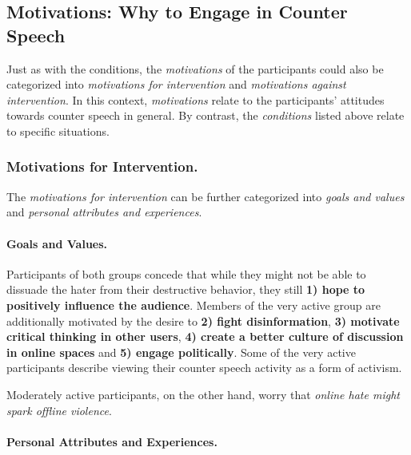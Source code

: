 \documentclass[runningheads]{llncs}
\begin{document}
\hypertarget{motivations-why-to-engage-in-counter-speech}{%
\subsection{Motivations: Why to Engage in Counter Speech}\label{motivations-why-to-engage-in-counter-speech}}

Just as with the conditions, the \emph{motivations} of the participants could also be categorized into \emph{motivations for intervention} and \emph{motivations against intervention}. In this context, \emph{motivations} relate to the participants' attitudes towards counter speech in general. By contrast, the \emph{conditions} listed above relate to specific situations.

\hypertarget{motivations-for-intervention.}{%
\subsubsection{Motivations for Intervention.}\label{motivations-for-intervention.}}

The \emph{motivations for intervention} can be further categorized into \emph{goals and values} and \emph{personal attributes and experiences}.

\hypertarget{goals-and-values.}{%
\paragraph{Goals and Values.}\label{goals-and-values.}}

Participants of both groups concede that while they might not be able to dissuade the hater from their destructive behavior, they still \textbf{1) hope to positively influence the audience}.
Members of the very active group are additionally motivated by the desire to
\textbf{2) fight disinformation},
\textbf{3) motivate critical thinking in other users},
\textbf{4) create a better culture of discussion in online spaces} and
\textbf{5) engage politically}.
Some of the very active participants describe viewing their counter speech activity as a form of activism.

Moderately active participants, on the other hand, worry that \emph{online hate might spark offline violence}.

\hypertarget{personal-attributes-and-experiences.}{%
\paragraph{Personal Attributes and Experiences.}\label{personal-attributes-and-experiences.}}
\end{document}
